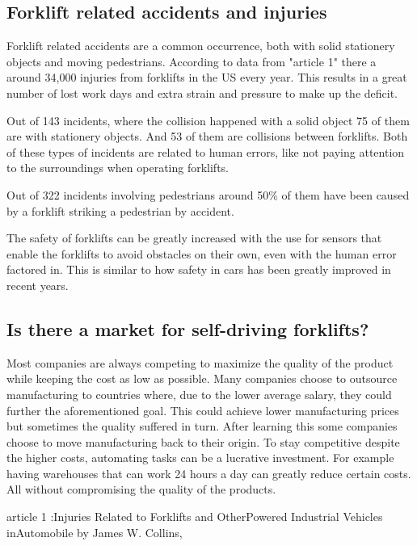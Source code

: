 \documentclass[11pt]{article}
\begin{document}
    \subsection{Forklift related accidents and injuries}
    Forklift related accidents are a common occurrence, both with solid
    stationery objects and moving pedestrians. According to data from "article
    1" there a around 34,000 injuries from forklifts in the US every year. This
    results in a great number of lost work days and extra strain and 
    pressure to make up the deficit.

    Out of 143 incidents, where the collision happened with a solid object
    75 of them are with stationery objects. And 53 of them are collisions 
    between forklifts. Both of these types of incidents are related to 
    human errors, like not paying attention to the surroundings when 
    operating forklifts.

    Out of 322 incidents involving pedestrians around 50\% of them have 
    been caused by a forklift striking a pedestrian by accident.

    The safety of forklifts can be greatly increased with the use for sensors that
    enable the forklifts to avoid obstacles on their own, even with the human 
    error factored in. This is similar to how safety in cars has been greatly
    improved in recent years.

    \subsection{Is there a market for self-driving forklifts?}
    Most companies are always competing to maximize the quality of the product 
    while keeping the cost as low as possible. Many companies choose
    to outsource manufacturing to countries where, due to the lower
    average salary, they could further the aforementioned goal.
    This could achieve lower manufacturing prices but sometimes 
    the quality suffered in turn. After learning this some companies
    choose to move manufacturing back to their origin. To stay
    competitive despite the higher costs, automating tasks can be
    a lucrative investment. For example having warehouses that can
    work 24 hours a day can greatly reduce certain costs. All without
    compromising the quality of the products.

    article 1 :Injuries Related to Forklifts and OtherPowered Industrial
    Vehicles inAutomobile  by James W. Collins,
\end{document}

